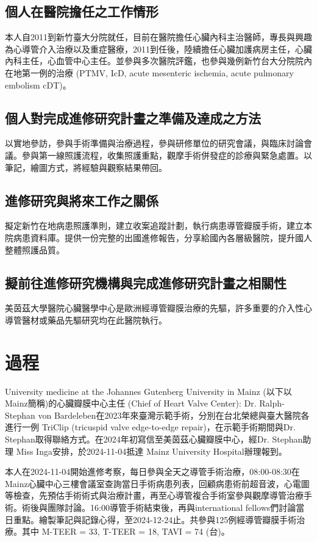 \documentclass[nols]{tufte-book}
\begin{document}
\subsection{個人在醫院擔任之工作情形} 
本人自2011到新竹臺大分院就任，目前在醫院擔任心臟內科主治醫師，專長與興趣為心導管介入治療以及重症醫療，2011到任後，陸續擔任心臟加護病房主任，心臟內科主任，心血管中心主任。並參與多次醫院評鑑，也參與幾例新竹台大分院院內在地第一例的治療 (PTMV, IcD, acute mesenteric ischemia, acute pulmonary embolism cDT)。

\subsection{個人對完成進修研究計畫之準備及達成之方法} 
以實地參訪，參與手術準備與治療過程，參與研修單位的研究會議，與臨床討論會議。參與第一線照護流程，收集照護重點，觀摩手術併發症的診療與緊急處置。以筆記，繪圖方式，將經驗與觀察結果帶回。

\subsection{進修研究與將來工作之關係} 
擬定新竹在地病患照護準則，建立收案追蹤計劃，執行病患導管瓣膜手術，建立本院病患資料庫。提供一份完整的出國進修報告，分享給國內各層級醫院，提升國人整體照護品質。

\subsection{擬前往進修研究機構與完成進修研究計畫之相關性} 
美茵茲大學醫院心臟醫學中心是歐洲經導管瓣膜治療的先驅，許多重要的介入性心導管醫材或藥品先驅研究均在此醫院執行。

\section{過程}
University medicine at the Johannes Gutenberg University in Mainz (以下以Mainz簡稱)的心臟瓣膜中心主任 (Chief of Heart Valve Center): Dr. Ralph-Stephan von Bardeleben在2023年來臺灣示範手術，分別在台北榮總與臺大醫院各進行一例 TriClip (tricuspid valve edge-to-edge repair)，在示範手術期間與Dr. Stephan取得聯絡方式。在2024年初寫信至美茵茲心臟瓣膜中心，經Dr. Stephan助理 Miss Inga安排，於2024-11-04抵達 Mainz University Hospital辦理報到。



本人在2024-11-04開始進修考察，每日參與全天之導管手術治療，08:00-08:30在Mainz心臟中心三樓會議室查詢當日手術病患列表，回顧病患術前超音波，心電圖等檢查，先預估手術術式與治療計畫，再至心導管複合手術室參與觀摩導管治療手術。術後與團隊討論。16:00導管手術結束後，再與international fellows們討論當日重點。繪製筆記與記錄心得，至2024-12-24止。共參與125例經導管瓣膜手術治療。其中 M-TEER = 33, T-TEER = 18, TAVI = 74 (台)。
\end{document}
